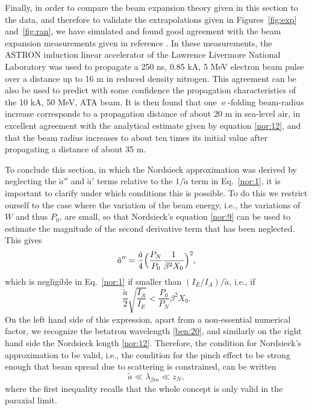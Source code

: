 \documentclass [12pt,a4paper,     ]{report} %
\newcommand{\e  }{\operatorname{e}}   %
\begin{document}
   Finally, in order to compare the beam expansion theory given in this section to the data, and therefore to validate the extrapolations given in Figures~\ref{fig:exp} and~\ref{fig:ran}, we have simulated and found good agreement with the beam expansion measurements given in reference \cite{BRIGG1976-}.  In these measurements, the ASTRON induction linear accelerator of the Lawrence Livermore National Laboratory was used to propagate a 250 ns, 0.85 kA, 5 MeV electron beam pulse over a distance up to 16 m in reduced density nitrogen.  This agreement can be also be used to predict with some confidence the propagation characteristics of the 10 kA, 50 MeV, ATA beam.  It is then found that one $\e$-folding beam-radius increase corresponds to a propagation distance of about 20 m in sea-level air, in excellent agreement with the analytical estimate given by equation \eqref{nor:12}, and that the beam radius increases to about ten times its initial value after propagating a distance of about 35 m.

  To conclude this section, in which the Nordsieck approximation was derived by neglecting the $\tilde{a}''$ and $\tilde{a}'$ terms relative to the $1/\tilde{a}$ term in Eq.~\eqref{nor:1}, it is important to clarify under which conditions this is possible.  To do this we restrict ourself to the case where the variation of the beam energy, i.e., the variations of $W$ and thus $P_0$, are small, so that Nordsieck's equation \eqref{nor:9} can be used to estimate the magnitude of the second derivative term that has been neglected.  This gives
%
\begin{equation}\label{nor:15} %
  \tilde{a}'' = \frac{\tilde{a}}{4}
                \Bigl (\frac{P_N}{P_0} \frac{1}{\beta^2 X_0} \Bigr)^2, 
\end{equation}
%
which is negligible in Eq.~\eqref{nor:1} if smaller than $(I_E/I_A)/\tilde{a}$, i.e., if
%
\begin{equation}\label{nor:16} %
  \frac{\tilde{a}}{2} \sqrt{ \frac{I_A}{I_E} }  <
               \frac{P_0}{P_N} \beta^2 X_0. 
\end{equation}
%
On the left hand side of this expression, apart from a non-essential numerical factor, we recognize the betatron wavelength \eqref{ben:20}, and similarly on the right hand side the Nordsieck length \eqref{nor:12}.  Therefore, the condition for Nordsieck's approximation to be valid, i.e., the condition for the pinch effect to be strong enough that beam spread due to scattering is constrained, can be written
%
\begin{equation}\label{nor:17} %
    \tilde{a}  \ll \lambda_{\beta m} \ll z_N, 
\end{equation}
%
where the first inequality recalls that the whole concept is only valid in the paraxial limit. 
\end{document}
